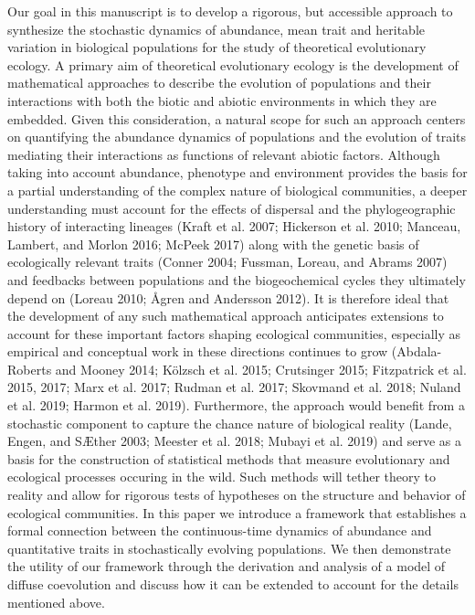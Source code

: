 \documentclass[]{article}
\begin{document}
Our goal in this manuscript is to develop a rigorous, but accessible
approach to synthesize the stochastic dynamics of abundance, mean trait
and heritable variation in biological populations for the study of
theoretical evolutionary ecology. A primary aim of theoretical
evolutionary ecology is the development of mathematical approaches to
describe the evolution of populations and their interactions with both
the biotic and abiotic environments in which they are embedded. Given
this consideration, a natural scope for such an approach centers on
quantifying the abundance dynamics of populations and the evolution of
traits mediating their interactions as functions of relevant abiotic
factors. Although taking into account abundance, phenotype and
environment provides the basis for a partial understanding of the
complex nature of biological communities, a deeper understanding must
account for the effects of dispersal and the phylogeographic history of
interacting lineages (Kraft et al. 2007; Hickerson et al. 2010; Manceau,
Lambert, and Morlon 2016; McPeek 2017) along with the genetic basis of
ecologically relevant traits (Conner 2004; Fussman, Loreau, and Abrams
2007) and feedbacks between populations and the biogeochemical cycles
they ultimately depend on (Loreau 2010; Ågren and Andersson 2012). It is
therefore ideal that the development of any such mathematical approach
anticipates extensions to account for these important factors shaping
ecological communities, especially as empirical and conceptual work in
these directions continues to grow (Abdala-Roberts and Mooney 2014;
Kölzsch et al. 2015; Crutsinger 2015; Fitzpatrick et al. 2015, 2017;
Marx et al. 2017; Rudman et al. 2017; Skovmand et al. 2018; Nuland et
al. 2019; Harmon et al. 2019). Furthermore, the approach would benefit
from a stochastic component to capture the chance nature of biological
reality (Lande, Engen, and SÆther 2003; Meester et al. 2018; Mubayi et
al. 2019) and serve as a basis for the construction of statistical
methods that measure evolutionary and ecological processes occuring in
the wild. Such methods will tether theory to reality and allow for
rigorous tests of hypotheses on the structure and behavior of ecological
communities. In this paper we introduce a framework that establishes a
formal connection between the continuous-time dynamics of abundance and
quantitative traits in stochastically evolving populations. We then
demonstrate the utility of our framework through the derivation and
analysis of a model of diffuse coevolution and discuss how it can be
extended to account for the details mentioned above.
\end{document}

